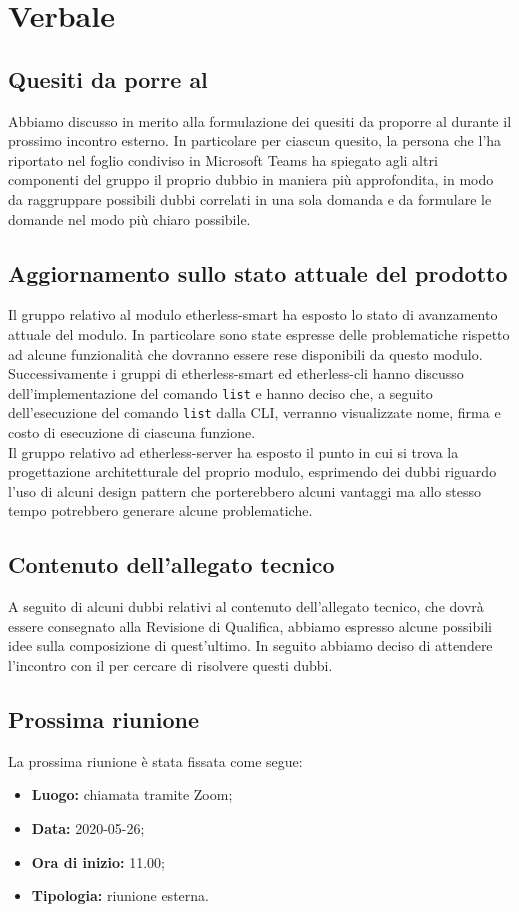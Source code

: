 \section{Verbale}
	\subsection{Quesiti da porre al \TV}
	Abbiamo discusso in merito alla formulazione dei quesiti da proporre al \TV{} durante il prossimo incontro esterno.
	In particolare per ciascun quesito, la persona che l'ha riportato nel foglio condiviso in Microsoft Teams\textit{} ha spiegato agli altri componenti del gruppo il proprio dubbio in maniera più approfondita, in modo da raggruppare possibili dubbi correlati in una sola domanda e da formulare le domande nel modo più chiaro possibile.
	
	\subsection{Aggiornamento sullo stato attuale del prodotto}
	Il gruppo relativo al modulo etherless-smart ha esposto lo stato di avanzamento attuale del modulo.
	In particolare sono state espresse delle problematiche rispetto ad alcune funzionalità che dovranno essere rese disponibili da questo modulo. \\
	Successivamente i gruppi di etherless-smart ed etherless-cli hanno discusso dell'implementazione del comando \texttt{list} e hanno deciso che, a seguito dell'esecuzione del comando \texttt{list} dalla CLI\textit{}, verranno visualizzate nome, firma e costo di esecuzione di ciascuna funzione. \\
	Il gruppo relativo ad etherless-server ha esposto il punto in cui si trova la progettazione architetturale del proprio modulo, esprimendo dei dubbi riguardo l'uso di alcuni design pattern che porterebbero alcuni vantaggi ma allo stesso tempo potrebbero generare alcune problematiche.
	
	\subsection{Contenuto dell'allegato tecnico}
	A seguito di alcuni dubbi relativi al contenuto dell'allegato tecnico, che dovrà essere consegnato alla Revisione di Qualifica, abbiamo espresso alcune possibili idee sulla composizione di quest'ultimo. In seguito abbiamo deciso di attendere l'incontro con il \RC{} per cercare di risolvere questi dubbi.
	
	\subsection{Prossima riunione}
		La prossima riunione è stata fissata come segue:
		\begin{itemize}
			\item \textbf{Luogo:} chiamata tramite Zoom; 
			\item \textbf{Data:} 2020-05-26;
			\item \textbf{Ora di inizio:} 11.00;
			\item \textbf{Tipologia:} riunione esterna.
		\end{itemize}